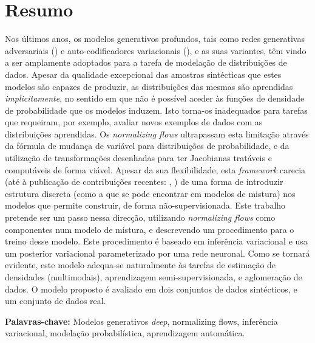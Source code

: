 \section*{Resumo}


Nos últimos anos, os modelos generativos profundos, tais como redes generativas
adversariais (\autocite{GAN}) e auto-codificadores variacionais (\autocite{vaepaper}),
e as suas variantes, têm vindo a ser amplamente adoptados para a tarefa de modelação
de distribuições de dados. Apesar da qualidade excepcional das amostras sintécticas
que estes modelos são capazes de produzir, as distribuições das mesmas são aprendidas
\emph{implicitamente}, no sentido em que não é possível aceder às funções de densidade
de probabilidade que os modelos induzem. Isto torna-os inadequados para tarefas que
requeiram, por exemplo, avaliar novos exemplos de dados com as distribuições
aprendidas. Os \emph{normalizing flows} ultrapassam esta limitação através da
fórmula de mudança de variável para distribuições de probabilidade, e da utilização
de transformações desenhadas para ter Jacobianas tratáveis e computáveis de forma
viável. Apesar da sua flexibilidade, esta \emph{framework} carecia (até à publicação
de contribuições recentes: \autocite{semisuplearning_nflows}, \autocite{RAD}) de uma forma
de introduzir estrutura discreta (como a que se pode encontrar em modelos de mistura)
nos modelos que permite construir, de forma não-supervisionada. Este trabalho
pretende ser um passo nessa direcção, utilizando \emph{normalizing flows} como
componentes num modelo de mistura, e descrevendo um procedimento para o treino
desse modelo. Este procedimento é baseado em inferência variacional e usa um posterior
variacional parameterizado por uma rede neuronal. Como se tornará evidente, este
modelo adequa-se naturalmente às tarefas de estimação de densidades (multimodais),
aprendizagem semi-supervisionada, e aglomeração de dados. O modelo proposto é
avaliado em dois conjuntos de dados sintécticos, e um conjunto de dados real.
\vfill

\textbf{\Large Palavras-chave:} Modelos generativos \emph{deep}, normalizing flows,
inferência variacional, modelação probabilística, aprendizagem automática.
